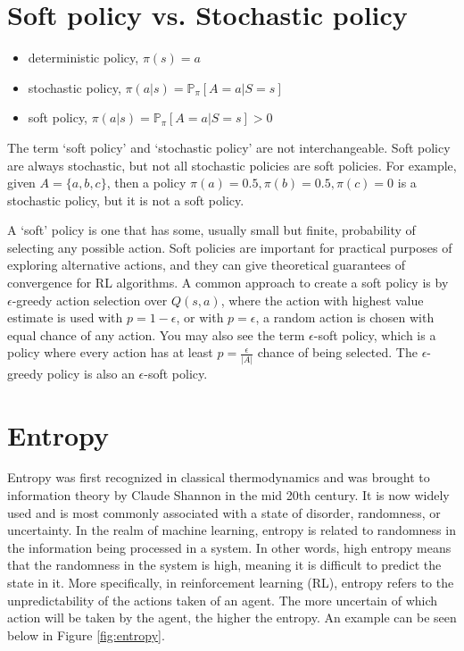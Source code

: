 \documentclass[lang=en,mode=normal,device=normal,color=blue,12pt]{elegantnote}
\DeclareMathOperator*{\1}{\mathbbm{1}}
\begin{document}

\newpage
\begin{appendices}

\section{Soft policy vs. Stochastic policy}

\begin{itemize}
\item deterministic policy, $\pi(s) = a$
\item stochastic policy, $\pi(a|s) = \mathbb{P}_\pi [A=a | S=s]$
\item soft policy, $\pi(a|s) = \mathbb{P}_\pi [A=a | S=s] > 0$
\end{itemize}

The term `soft policy' and `stochastic policy' are not interchangeable. Soft policy are always stochastic, but not all stochastic policies are soft policies. For example, given $A = \{a,b,c\}$, then a policy $\pi(a) = 0.5, \pi(b)=0.5, \pi(c)=0$ is a stochastic policy, but it is not a soft policy.

A `soft' policy is one that has some, usually small but finite, probability of selecting any possible action. Soft policies are important for practical purposes of exploring alternative actions, and they can give theoretical guarantees of convergence for RL algorithms.
A common approach to create a soft policy is by $\epsilon$-greedy action selection over $Q(s,a)$, where the action with highest value estimate is used with $p = 1 - \epsilon$, or with $p = \epsilon$, a random action is chosen with equal chance of any action.
You may also see the term $\epsilon$-soft policy, which is a policy where every action has at least $p = \frac{\epsilon}{|A|}$ chance of being selected.
The $\epsilon$-greedy policy is also an $\epsilon$-soft policy.


\section{Entropy}
\label{appendix:entropy}

Entropy was first recognized in classical thermodynamics and was brought to information theory by Claude Shannon in the mid 20th century. It is now widely used and is most commonly associated with a state of disorder, randomness, or uncertainty.
In the realm of machine learning, entropy is related to randomness in the information being processed in a system. In other words, high entropy means that the randomness in the system is high, meaning it is difficult to predict the state in it. More specifically, in reinforcement learning (RL), entropy refers to the unpredictability of the actions taken of an agent. The more uncertain of which action will be taken by the agent, the higher the entropy. An example can be seen below in Figure \ref{fig:entropy}.


\end{appendices}
\end{document}
